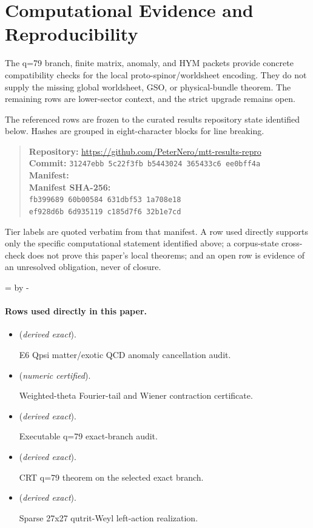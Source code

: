 \documentclass[11pt]{article}
\begin{document}
\section*{Computational Evidence and Reproducibility}
The q=79 branch, finite matrix, anomaly, and HYM packets provide concrete compatibility checks for the local proto-spinor/worldsheet encoding. They do not supply the missing global worldsheet, GSO, or physical-bundle theorem. The remaining rows are lower-sector context, and the strict upgrade remains open.

The referenced rows are frozen to the curated results repository state identified below. Hashes are grouped in eight-character blocks for line breaking.
\begin{quote}\small
\textbf{Repository:} \url{https://github.com/PeterNero/mtt-results-repro}\\
\textbf{Commit:} \texttt{31247ebb 5c22f3fb b5443024 365433c6 ee0bff4a}\\
\textbf{Manifest:} \\
\textbf{Manifest SHA-256:}\\
\texttt{fb399689 60b00584 631dbf53 1a708e18}\\
\texttt{ef928d6b 6d935119 c185d7f6 32b1e7cd}
\end{quote}

Tier labels are quoted verbatim from that manifest. A row used directly supports only the specific computational statement identified above; a corpus-state cross-check does not prove this paper's local theorems; and an open row is evidence of an unresolved obligation, never of closure.

\par\begingroup{}=\pagegoal\advance{} by -\pagetotal\ifdim\dimen0<7\baselineskip\newpage\fi\endgroup
\paragraph{Rows used directly in this paper.}
\begin{itemize}
\setlength{\itemsep}{0.25em}
\item {} (\emph{derived exact}).\par E6 Qpsi matter/exotic QCD anomaly cancellation audit.
\item {} (\emph{numeric certified}).\par Weighted-theta Fourier-tail and Wiener contraction certificate.
\item {} (\emph{derived exact}).\par Executable q=79 exact-branch audit.
\item {} (\emph{derived exact}).\par CRT q=79 theorem on the selected exact branch.
\item {} (\emph{derived exact}).\par Sparse 27x27 qutrit-Weyl left-action realization.
\end{itemize}
\end{document}
